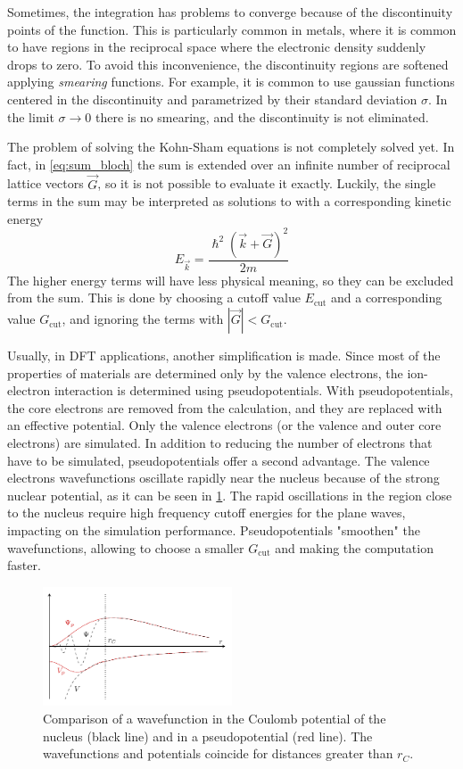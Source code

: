 Sometimes, the integration has problems to converge because of the discontinuity points of the function. This is particularly common in metals, where it is common to have regions in the reciprocal space where the electronic density suddenly drops to zero. To avoid this inconvenience, the discontinuity regions are softened applying \emph{smearing} functions. For example, it is common to use gaussian functions centered in the discontinuity and parametrized by their standard deviation $\sigma$. In the limit $\sigma \rightarrow 0$ there is no smearing, and the discontinuity is not eliminated.

The problem of solving the Kohn-Sham equations is not completely solved yet. In fact, in \cref{eq:sum_bloch} the sum is extended over an infinite number of reciprocal lattice vectors $\vec{G}$, so it is not possible to evaluate it exactly. Luckily, the single terms in the sum may be interpreted as solutions to \sches with a corresponding kinetic energy
\begin{equation}
    E_\vec{k} = \frac{\hslash^2(\vec{k}+\vec{G})^2}{2m}
\end{equation}
The higher energy terms will have less physical meaning, so they can be excluded from the sum. This is done by choosing a cutoff value $E_\text{cut}$ and a corresponding value $G_\text{cut}$, and ignoring the terms with $|\vec{G}| < G_\text{cut}$.

Usually, in DFT applications, another simplification is made. Since most of the properties of materials are determined only by the valence electrons, the ion-electron interaction is determined using pseudopotentials. With pseudopotentials, the core electrons are removed from the calculation, and they are replaced with an effective potential. Only the valence electrons (or the valence and outer core electrons) are simulated. In addition to reducing the number of electrons that have to be simulated, pseudopotentials offer a second advantage. The valence electrons wavefunctions oscillate rapidly near the nucleus because of the strong nuclear potential, as it can be seen in \cref{fig:pseudopotential}. The rapid oscillations in the region close to the nucleus require high frequency cutoff energies for the plane waves, impacting on the simulation performance. Pseudopotentials "smoothen" the wavefunctions, allowing to choose a smaller $G_\text{cut}$ and making the computation faster.

\begin{figure}
    \centering
    \includegraphics[width=0.5\textwidth]{figures/pseudopotential/pseudopotential.pdf}
    \caption[Pseudopotentials]{Comparison of a wavefunction in the Coulomb potential of the nucleus (black line) and in a pseudopotential (red line). The wavefunctions and potentials coincide for distances greater than $r_C$.}
    \label{fig:pseudopotential}
\end{figure}
